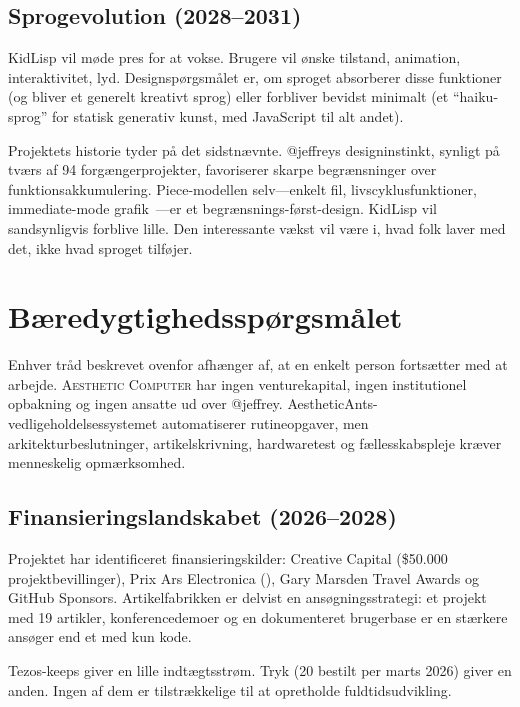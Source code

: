 \documentclass[10pt,letterpaper,twocolumn]{article}
\newcommand{\ac}{\textsc{Aesthetic Computer}}
\begin{document}
\subsection{Sprogevolution (2028--2031)}

KidLisp vil møde pres for at vokse. Brugere vil ønske tilstand, animation, interaktivitet, lyd. Designspørgsmålet er, om sproget absorberer disse funktioner (og bliver et generelt kreativt sprog) eller forbliver bevidst minimalt (et ``haiku-sprog'' for statisk generativ kunst, med JavaScript til alt andet).

Projektets historie tyder på det sidstnævnte. @jeffreys designinstinkt, synligt på tværs af 94 forgængerprojekter, favoriserer skarpe begrænsninger over funktionsakkumulering. Piece-modellen selv---enkelt fil, livscyklusfunktioner, immediate-mode grafik~\citep{scudder2026pieces}---er et begrænsnings-først-design. KidLisp vil sandsynligvis forblive lille. Den interessante vækst vil være i, hvad folk laver med det, ikke hvad sproget tilføjer.


\section{Bæredygtighedsspørgsmålet}
\label{sec:sustainability}

Enhver tråd beskrevet ovenfor afhænger af, at en enkelt person fortsætter med at arbejde. \ac{} har ingen venturekapital, ingen institutionel opbakning og ingen ansatte ud over @jeffrey. AestheticAnts-vedligeholdelsessystemet automatiserer rutineopgaver, men arkitekturbeslutninger, artikelskrivning, hardwaretest og fællesskabspleje kræver menneskelig opmærksomhed.

\subsection{Finansieringslandskabet (2026--2028)}

Projektet har identificeret finansieringskilder: Creative Capital (\$50.000 projektbevillinger), Prix Ars Electronica (), Gary Marsden Travel Awards og GitHub Sponsors. Artikelfabrikken er delvist en ansøgningsstrategi: et projekt med 19 artikler, konferencedemoer og en dokumenteret brugerbase er en stærkere ansøger end et med kun kode.

Tezos-keeps giver en lille indtægtsstrøm. Tryk (20 bestilt per marts 2026) giver en anden. Ingen af dem er tilstrækkelige til at opretholde fuldtidsudvikling.
\end{document}
